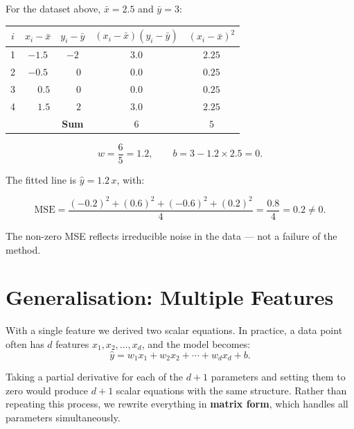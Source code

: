 \documentclass[12pt, a4paper]{article}
\newif\ifstudentmode
\newcommand{\sol}[2][6cm]{%
  \ifstudentmode
    \underline{\hspace{#1}}%
  \else
    {#2}%
  \fi
}
\theoremstyle{definition}
\newcommand{\xbar}{\bar{x}}
\newcommand{\ybar}{\bar{y}}
\newcommand{\yhat}{\hat{y}}
\begin{document}
For the dataset above, $\xbar = 2.5$ and $\ybar = 3$:

\begin{center}
\renewcommand{\arraystretch}{1.3}
\begin{tabular}{ccccc}
\toprule
$i$ & $x_i - \xbar$ & $y_i - \ybar$
    & $(x_i-\xbar)(y_i-\ybar)$ & $(x_i-\xbar)^2$ \\
\midrule
1 & $-1.5$ & $-2$ & $3.0$ & $2.25$ \\
2 & $-0.5$ & $\phantom{-}0$ & $0.0$ & $0.25$ \\
3 & $\phantom{-}0.5$ & $\phantom{-}0$ & $0.0$ & $0.25$ \\
4 & $\phantom{-}1.5$ & $\phantom{-}2$ & $3.0$ & $2.25$ \\
\midrule
  & & \textbf{Sum} & $6$ & $5$ \\
\bottomrule
\end{tabular}
\end{center}

\[
  w = \sol{\dfrac{6}{5} = 1.2},
  \qquad
  b = \sol{3 - 1.2 \times 2.5 = 0}.
\]

The fitted line is $\yhat = \sol{1.2\,x}$, with:

\[
  \mathrm{MSE}
  = \frac{(-0.2)^2 + (0.6)^2 + (-0.6)^2 + (0.2)^2}{4}
  = \sol{\dfrac{0.8}{4} = 0.2} \neq 0.
\]

The non-zero MSE reflects irreducible noise in the data — not a failure of the
method.

\section{Generalisation: Multiple Features}

With a single feature we derived two scalar equations. In practice, a data
point often has $d$ features $x_1, x_2, \ldots, x_d$, and the model becomes:
\[
  \yhat = w_1 x_1 + w_2 x_2 + \cdots + w_d x_d + b.
\]

Taking a partial derivative for each of the $d+1$ parameters and setting them
to zero would produce $d+1$ scalar equations with the same structure. Rather
than repeating this process, we rewrite everything in \textbf{matrix form},
which handles all parameters simultaneously.

\end{document}
